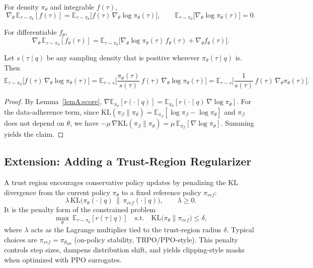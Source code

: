 \documentclass{article} %
\newcommand{\0}{\mathbb{0}}
\newcommand{\1}{\mathbb{1}}
\newcommand{\E}{\mathbb{E}}
\begin{document}
\begin{lemmaA}
\label{lemA:score}
For density $\pi_\theta$ and integrable $f(\tau)$,
\[
\nabla_\theta \,\E_{\tau\sim \pi_\theta}[f(\tau)]
=\E_{\tau\sim \pi_\theta}\!\big[f(\tau)\,\nabla_\theta \log \pi_\theta(\tau)\big],
\qquad
\E_{\tau\sim \pi_\theta}\!\big[\nabla_\theta \log \pi_\theta(\tau)\big]=0.
\]
\end{lemmaA}

\begin{lemmaA}
\label{lemA:param-int}
For differentiable $f_\theta$,
\[
\nabla_\theta \,\E_{\tau\sim \pi_\theta}[f_\theta(\tau)]
= \E_{\tau\sim \pi_\theta}\!\big[\nabla_\theta \log \pi_\theta(\tau)\,f_\theta(\tau)+\nabla_\theta f_\theta(\tau)\big].
\]
\end{lemmaA}

\begin{lemmaA}
\label{lemA:measure}
Let $s(\tau\mid q)$ be any sampling density that is positive wherever $\pi_\theta(\tau\mid q)$ is. Then
\[
\E_{\tau\sim \pi_\theta}\!\big[f(\tau)\,\nabla_\theta \log \pi_\theta(\tau)\big]
=
\E_{\tau\sim s}\!\Big[\frac{\pi_\theta(\tau)}{s(\tau)}\,f(\tau)\,\nabla_\theta \log \pi_\theta(\tau)\Big]
=
\E_{\tau\sim s}\!\Big[\frac{1}{s(\tau)}\,f(\tau)\,\nabla_\theta \pi_\theta(\tau)\Big].
\]
\end{lemmaA}

\begin{proof}
By Lemma~\ref{lemA:score},
$\nabla \E_{\pi_\theta}[r(\cdot\mid q)]=\E_{\pi_\theta}[r(\cdot\mid q)\,\nabla \log \pi_\theta]$.
For the data-adherence term, since
$\mathrm{KL}(\pi_\beta\|\pi_\theta)=\E_{\pi_\beta}[\log \pi_\beta-\log \pi_\theta]$ and $\pi_\beta$ does not depend on $\theta$,
we have $-\mu\,\nabla \mathrm{KL}(\pi_\beta\|\pi_\theta)=\mu\,\E_{\pi_\beta}[\nabla \log \pi_\theta]$.
Summing yields the claim.
\end{proof}

\subsection{Extension: Adding a Trust-Region Regularizer}
\label{app:lambda-extension}
A trust region encourages conservative policy updates by penalizing the KL divergence from the current policy $\pi_\theta$ to a fixed reference policy $\pi_{ref}$:
\[
\lambda\,\mathrm{KL}\big(\pi_\theta(\cdot\mid q)\,\|\,\pi_{ref}(\cdot\mid q)\big),\qquad \lambda\ge 0.
\]
It is the penalty form of the constrained problem
\[
\max_\theta\ \E_{\tau\sim \pi_\theta}[r(\tau\mid q)]
\quad \text{s.t.}\quad \mathrm{KL}\big(\pi_\theta\|\pi_{ref}\big)\le \delta,
\]
where $\lambda$ acts as the Lagrange multiplier tied to the trust-region radius $\delta$.
Typical choices are $\pi_{ref}=\pi_{\theta_{old}}$ (on-policy stability, TRPO/PPO-style). This penalty controls step sizes, dampens distribution shift, and yields clipping-style masks when optimized with PPO surrogates.
\end{document}
